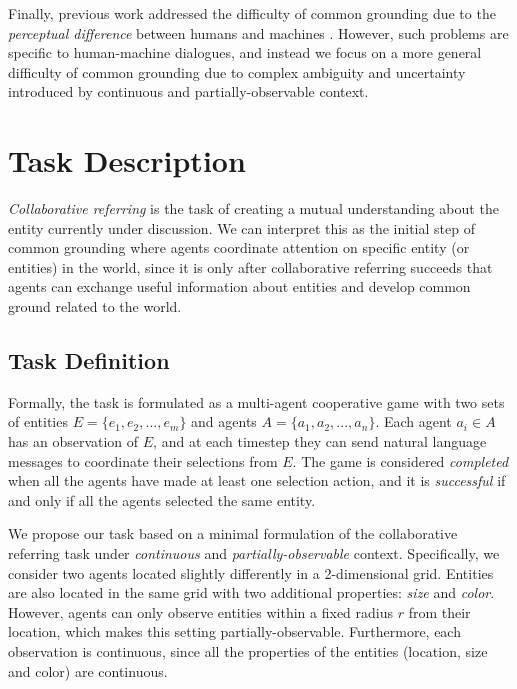 \documentclass[letterpaper]{article}
\begin{document}
Finally, previous work addressed the difficulty of common grounding due to the \emph{perceptual difference} between humans and machines \cite{liu2012perceptual,fang2015embodied}. However, such problems are specific to human-machine dialogues, and instead we focus on a more general difficulty of common grounding due to complex ambiguity and uncertainty introduced by continuous and partially-observable context.

\section{Task Description}
\label{section:task_description}

\emph{Collaborative referring} is the task of creating a mutual understanding about the entity currently under discussion. We can interpret this as the initial step of common grounding where agents coordinate attention on specific entity (or entities) in the world, since it is only after collaborative referring succeeds that agents can exchange useful information about entities and develop common ground related to the world.

\subsection{Task Definition}

Formally, the task is formulated as a multi-agent cooperative game with two sets of entities $E = \{e_1, e_2, ... , e_m\}$ and agents $A = \{a_1, a_2, ... , a_n\}$. Each agent $a_i \in A$ has an observation of $E$, and at each timestep they can send natural language messages to coordinate their selections from $E$. The game is considered \emph{completed} when all the agents have made at least one selection action, and it is \emph{successful} if and only if all the agents selected the same entity.

We propose our task based on a minimal formulation of the collaborative referring task under \emph{continuous} and \emph{partially-observable} context. Specifically, we consider two agents located slightly differently in a 2-dimensional grid. Entities are also located in the same grid with two additional properties: \emph{size} and \emph{color}. However, agents can only observe entities within a fixed radius $r$ from their location, which makes this setting partially-observable. Furthermore, each observation is continuous, since all the properties of the entities (location, size and color) are continuous.
\end{document}
